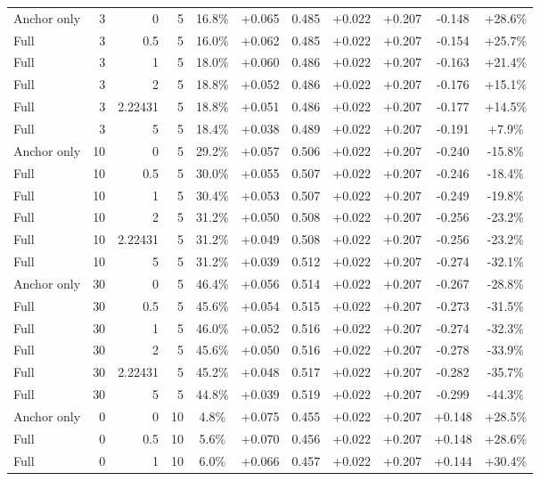 \begin{table}[htbp]
\begin{tabular}{lrrrccccccc}
Anchor only & 3 & 0 & 5 & 16.8\% & +0.065 & 0.485 & +0.022 & +0.207 & -0.148 & +28.6\% \\
Full & 3 & 0.5 & 5 & 16.0\% & +0.062 & 0.485 & +0.022 & +0.207 & -0.154 & +25.7\% \\
Full & 3 & 1 & 5 & 18.0\% & +0.060 & 0.486 & +0.022 & +0.207 & -0.163 & +21.4\% \\
Full & 3 & 2 & 5 & 18.8\% & +0.052 & 0.486 & +0.022 & +0.207 & -0.176 & +15.1\% \\
Full & 3 & 2.22431 & 5 & 18.8\% & +0.051 & 0.486 & +0.022 & +0.207 & -0.177 & +14.5\% \\
Full & 3 & 5 & 5 & 18.4\% & +0.038 & 0.489 & +0.022 & +0.207 & -0.191 & +7.9\% \\
Anchor only & 10 & 0 & 5 & 29.2\% & +0.057 & 0.506 & +0.022 & +0.207 & -0.240 & -15.8\% \\
Full & 10 & 0.5 & 5 & 30.0\% & +0.055 & 0.507 & +0.022 & +0.207 & -0.246 & -18.4\% \\
Full & 10 & 1 & 5 & 30.4\% & +0.053 & 0.507 & +0.022 & +0.207 & -0.249 & -19.8\% \\
Full & 10 & 2 & 5 & 31.2\% & +0.050 & 0.508 & +0.022 & +0.207 & -0.256 & -23.2\% \\
Full & 10 & 2.22431 & 5 & 31.2\% & +0.049 & 0.508 & +0.022 & +0.207 & -0.256 & -23.2\% \\
Full & 10 & 5 & 5 & 31.2\% & +0.039 & 0.512 & +0.022 & +0.207 & -0.274 & -32.1\% \\
Anchor only & 30 & 0 & 5 & 46.4\% & +0.056 & 0.514 & +0.022 & +0.207 & -0.267 & -28.8\% \\
Full & 30 & 0.5 & 5 & 45.6\% & +0.054 & 0.515 & +0.022 & +0.207 & -0.273 & -31.5\% \\
Full & 30 & 1 & 5 & 46.0\% & +0.052 & 0.516 & +0.022 & +0.207 & -0.274 & -32.3\% \\
Full & 30 & 2 & 5 & 45.6\% & +0.050 & 0.516 & +0.022 & +0.207 & -0.278 & -33.9\% \\
Full & 30 & 2.22431 & 5 & 45.2\% & +0.048 & 0.517 & +0.022 & +0.207 & -0.282 & -35.7\% \\
Full & 30 & 5 & 5 & 44.8\% & +0.039 & 0.519 & +0.022 & +0.207 & -0.299 & -44.3\% \\
Anchor only & 0 & 0 & 10 & 4.8\% & +0.075 & 0.455 & +0.022 & +0.207 & +0.148 & +28.5\% \\
Full & 0 & 0.5 & 10 & 5.6\% & +0.070 & 0.456 & +0.022 & +0.207 & +0.148 & +28.6\% \\
Full & 0 & 1 & 10 & 6.0\% & +0.066 & 0.457 & +0.022 & +0.207 & +0.144 & +30.4\% \\

\end{tabular}
\end{table}
